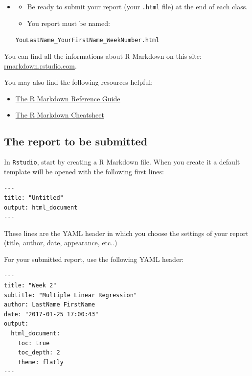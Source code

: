 \documentclass[]{book}
\providecommand{\tightlist}{%
  \setlength{\itemsep}{0pt}\setlength{\parskip}{0pt}}
\newenvironment{rmdblock}[1]
  {\begin{shaded*}
  \begin{itemize}
  \renewcommand{\labelitemi}{
    \raisebox{-.7\height}[0pt][0pt]{
      {\setkeys{Gin}{width=2em,keepaspectratio}\texttt{[image: img/icons/\#1]}}
    }
  }
  \item
  }
  {
  \end{itemize}
  \end{shaded*}
  }
\newenvironment{rmdcaution}
  {\begin{rmdblock}{caution}}
  {\end{rmdblock}}
\begin{document}
\begin{rmdcaution}
\begin{itemize}
\item
  Be ready to submit your report (your \texttt{.html} file) at the end
  of each class.
\item
  You report must be named:
\end{itemize}

\texttt{YouLastName\_YourFirstName\_WeekNumber.html}
\end{rmdcaution}

You can find all the informations about R Markdown on this site:
\href{http://rmarkdown.rstudio.com/lesson-1.html}{rmarkdown.rstudio.com}.

You may also find the following resources helpful:

\begin{itemize}
\tightlist
\item
  \href{https://www.rstudio.com/wp-content/uploads/2015/03/rmarkdown-reference.pdf}{The
  R Markdown Reference Guide}
\item
  \href{https://www.rstudio.com/wp-content/uploads/2016/03/rmarkdown-cheatsheet-2.0.pdf}{The
  R Markdown Cheatsheet}
\end{itemize}

\subsection*{The report to be
submitted}\label{the-report-to-be-submitted}

In \texttt{Rstudio}, start by creating a R Markdown file. When you
create it a default template will be opened with the following first
lines:

\begin{verbatim}
---
title: "Untitled"
output: html_document
---
\end{verbatim}

These lines are the YAML header in which you choose the settings of your
report (title, author, date, appearance, etc..)

For your submitted report, use the following YAML header:

\begin{verbatim}
---
title: "Week 2"
subtitle: "Multiple Linear Regression"
author: LastName FirstName
date: "2017-01-25 17:00:43"
output:
  html_document:
    toc: true
    toc_depth: 2
    theme: flatly
---
\end{verbatim}
\end{document}
